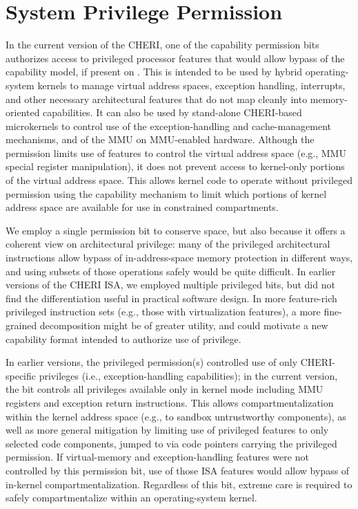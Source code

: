 \section{System Privilege Permission}

In the current version of the CHERI, one of the capability permission bits
authorizes access to privileged processor features that would allow
bypass of the capability model, if present on \PCC{}.
This is intended to be used by hybrid operating-system kernels to manage
virtual address spaces, exception handling, interrupts, and other necessary
architectural features that do not map cleanly into memory-oriented
capabilities.
It can also be used by stand-alone CHERI-based microkernels to control use
of the exception-handling and cache-management mechanisms, and of the MMU on
MMU-enabled hardware.
Although the permission limits use of features to control the virtual address
space (e.g., MMU special register manipulation), it does not prevent access to kernel-only
portions of the virtual address space.
This allows kernel code to operate without privileged permission using the
capability mechanism to limit which portions of kernel address space are
available for use in constrained compartments.

We employ a single permission bit to conserve space,
but also because it offers a coherent view on architectural
privilege: many of the privileged architectural instructions allow bypass of
in-address-space memory protection in different ways, and using subsets of
those operations safely would be quite difficult.
In earlier versions of the CHERI ISA, we employed multiple privileged bits,
but did not find the differentiation useful in practical software design.
In more feature-rich privileged instruction sets (e.g., those with
virtualization features), a more fine-grained decomposition might be of
greater utility, and could motivate a new capability format intended to
authorize use of privilege.

In earlier versions, the privileged permission(s) controlled use of only CHERI-specific
privileges (i.e., exception-handling capabilities); in the current version, the
bit controls all privileges available only in kernel mode including
MMU registers and exception return instructions.
This allows compartmentalization within the kernel address space (e.g., to
sandbox untrustworthy components), as well as more general mitigation by
limiting use of privileged features to only selected code components, jumped
to via code pointers carrying the privileged permission.
If virtual-memory and exception-handling features were not controlled by this
permission bit, use of those ISA features would allow bypass of in-kernel
compartmentalization.
Regardless of this bit, extreme care is required to safely compartmentalize
within an operating-system kernel.

